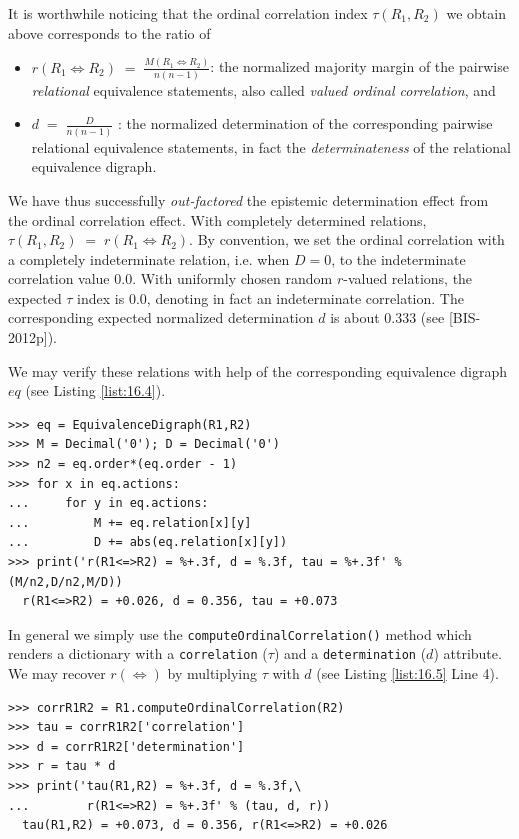 It is worthwhile noticing that the ordinal correlation index $\tau(R_1,R_2)$ we obtain above corresponds to the ratio of
\begin{itemize}
\item $r(R_1 \Leftrightarrow R_2) \;=\; \frac{M(R_1 \Leftrightarrow R_2)}{n(n-1)}$: the normalized majority margin of the pairwise \emph{relational} equivalence statements, also called \emph{valued ordinal correlation}, and 
\item $d \;=\; \frac{D}{n(n-1)}$ : the normalized determination of the corresponding pairwise relational equivalence statements, in fact the \emph{determinateness} of the relational equivalence digraph.
\end{itemize}

We have thus successfully \emph{out-factored} the epistemic determination effect from the ordinal correlation effect. With completely determined relations, $\tau(R_1,R_2) \;=\; r(R_1 \Leftrightarrow R_2)$. By convention, we set the ordinal correlation with a completely indeterminate relation, i.e. when $D = 0$, to the indeterminate correlation value $0.0$. With uniformly chosen random $r$-valued relations, the expected $\tau$ index is $0.0$, denoting in fact an indeterminate correlation. The corresponding expected normalized determination $d$ is about $0.333$ (see [BIS-2012p]).

We may verify these relations with help of the corresponding equivalence digraph $eq$ (see Listing \ref{list:16.4}).

\begin{lstlisting}[caption={Computing the ordinal correlation index from the equivalence digraph},label=list:16.4]
>>> eq = EquivalenceDigraph(R1,R2)
>>> M = Decimal('0'); D = Decimal('0')
>>> n2 = eq.order*(eq.order - 1)
>>> for x in eq.actions:
...     for y in eq.actions:
...         M += eq.relation[x][y]
...         D += abs(eq.relation[x][y])
>>> print('r(R1<=>R2) = %+.3f, d = %.3f, tau = %+.3f' % (M/n2,D/n2,M/D))   
  r(R1<=>R2) = +0.026, d = 0.356, tau = +0.073  
\end{lstlisting}

In general we simply use the \texttt{computeOrdinalCorrelation()} method which renders a dictionary with a \texttt{correlation} ($\tau$) and a \texttt{determination} ($d$) attribute. We may recover $r(\Leftrightarrow)$ by multiplying $\tau$ with $d$ (see Listing \ref{list:16.5} Line 4). 

\begin{lstlisting}[caption={Directly computing the ordinal correlation index},label=list:16.5]
>>> corrR1R2 = R1.computeOrdinalCorrelation(R2)
>>> tau = corrR1R2['correlation']
>>> d = corrR1R2['determination']
>>> r = tau * d
>>> print('tau(R1,R2) = %+.3f, d = %.3f,\
...        r(R1<=>R2) = %+.3f' % (tau, d, r))
  tau(R1,R2) = +0.073, d = 0.356, r(R1<=>R2) = +0.026
\end{lstlisting}

